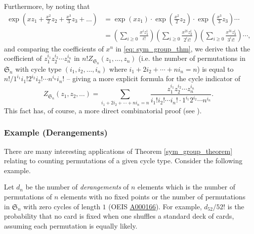 \documentclass[a4paper,11pt]{article}
\numberwithin{equation}{section}
\begin{document}
    Furthermore, by noting that 
    \begin{align*}
    \exp\left( xz_{1}+ \frac{x^{2}}{2} z_{2} + \frac{x^{3}}{3}z_{3} +\dots \right) &= \exp(xz_{1})\cdot\exp\left( \frac{x^{2}}{2} z_{2}  \right)\cdot\exp\left( \frac{x^{3}}{3}z_{3}  \right)\cdots \\
    &=\left( \sum_{i\geq 0} \frac{x^{i}z_{1}^{i}}{i!} \right) \left( \sum_{i\geq 0} \frac{x^{2i}z_{2}^{i}}{2^{i}i!} \right) \left( \sum_{i\geq 0} \frac{x^{3i}z_{3}^{i}}{3^{i}i!} \right) \cdots,
    \end{align*}
    and comparing the coefficients of $x^n$ in \eqref{eq: sym_group_thm}, we derive that the coefficient of $z_{1}^{i_{1}}z_{2}^{i_{2}}\cdots z_{n}^{i_{n}}$ in $n! Z_{\mathfrak{S}_{n}}(z_{1},\dots,z_{n})$ (i.e. the number of permutations in $\mathfrak{S}_{n}$ with cycle type $(i_{1},i_{2},\dots ,i_{n})$ where $i_1+2i_2 +\cdots + ni_n = n$) is equal to ${n!}/{1^{i_1}i_{1}!2^{i_{2}}i_{2}!\cdots n^{i_{n}}i_{n}!}$ -- giving a more explicit formula for the cycle indicator of $$Z_{\mathfrak{S}_{n}}(z_1, z_2, \dots) =\sum_{i_{1}+2i_{2}+\cdots + ni_{n}=n}  \frac{z_{1}^{i_{1}} z_{2}^{i_{2}}  \cdots z_{n}^{i_{n}}}{i_{1}!i_{2}!\cdots i_{n}!\cdot 1^{i_{1}} 2^{i_{2}} \cdots n^{i_{n}} } .$$ This fact has, of course, a more direct combinatorial proof (see \cite[p.~30]{stanleyEnumerativeCombinatoricsVolume1}).

    \subsubsection{Example \textnormal{(Derangements)}}There are many interesting applications of Theorem \ref{sym_group_theorem} relating to counting permutations of a given cycle type. Consider the following example. \smallskip
    
    Let $d_n$ be the number of \textit{derangements} of $n$ elements which is the number of permutations of $n$ elements with no fixed points or the number of permutations in \(\mathfrak{S}_n\) with zero cycles of length $1$ (OEIS \href{https://oeis.org/A000166}{A000166}). For example, $d_{52}/{52!}$ is the probability that no card is fixed when one shuffles a standard deck of cards, assuming each permutation is equally likely. \smallskip
    
\end{document}
